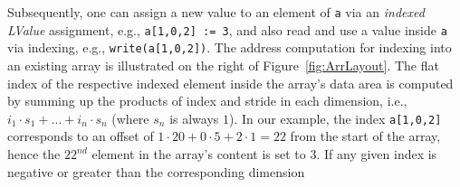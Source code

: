 \documentclass[12pt,a4paper]{article}
\begin{document}
Subsequently, one can assign a new value to an element of \texttt{a} via an
\emph{indexed LValue} assignment, e.g., \texttt{a[1,0,2] := 3}, and
also read and use a value inside \texttt{a} via indexing, e.g.,
\texttt{write(a[1,0,2])}.
The address computation for indexing into an existing array is illustrated
on the right of Figure~\ref{fig:ArrLayout}.
The flat index of the respective indexed element inside the array's data area
is computed by summing up the products of index and stride in each dimension,
i.e., $i_1\cdot s_1 + \ldots + i_n \cdot s_n$
(where $s_n$ is always $1$).
In our example, the index \texttt{a[1,0,2]} corresponds to an offset of
$ 1 \cdot 20 + 0 \cdot 5 + 2 \cdot 1 = 22$ from the start of the array,
hence the $22^{nd}$ element in the array's content is set to $3$.
If any given index is negative or greater than the corresponding dimension
\end{document}
